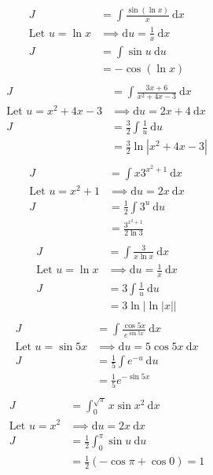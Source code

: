 \documentclass{article}
\theoremstyle{plain}
\theoremstyle{definition}
\begin{document}
\begin{align*}
	J&=\int \frac{\sin(\ln x)}{x}\ \text{d}x \\
	\text{Let } u = \ln x &\implies \text{d}u = \frac{1}{x}\ \text{d}x \\
	J&=\int \sin u\ \text{d}u \\
	 &=-\cos(\ln x) \\
\end{align*}
\begin{align*}
	J&=\int \frac{3x+6}{x^2+4x-3}\ \text{d}x \\
	\text{Let } u = x^2+4x-3 &\implies \text{d}u = 2x+4\ \text{d}x \\
	J&=\frac{3}{2}\int \frac{1}{u}\ \text{d}u \\
	 &=\frac{3}{2}\ln \left|x^2+4x-3\right| \\
\end{align*}
\begin{align*}
	J&=\int x 3^{x^2+1}\ \text{d}x \\
	\text{Let } u = x^2+1 &\implies \text{d}u = 2x\ \text{d}x \\
	J&=\frac{1}{2}\int 3^u\ \text{d}u \\
	 &=\frac{3^{x^2+1}}{2\ln 3} \\
\end{align*}
\begin{align*}
	J&=\int \frac{3}{x\ln x}\ \text{d}x \\
	\text{Let } u = \ln x &\implies \text{d}u = \frac{1}{x}\ \text{d}x \\
	J&=3\int \frac{1}{u}\ \text{d}u \\
	 &=3 \ln \left|\ln |x|\right| \\
\end{align*}
\begin{align*}
	J&=\int \frac{\cos 5x}{e^{\sin 5x}}\ \text{d}x \\
	\text{Let } u = \sin 5x &\implies \text{d}u = 5\cos 5x\ \text{d}x \\
	J&=\frac{1}{5}\int e^{-u}\ \text{d}u \\
	 &=\frac{1}{5} e^{-\sin 5x} \\
\end{align*}
\begin{align*}
	J&=\int_{0}^{\sqrt{\pi}} x\sin x^2\ \text{d}x \\
	\text{Let } u = x^2 &\implies \text{d}u = 2x\ \text{d}x \\
	J &= \frac{1}{2}\int_0^{\pi} \sin u\ \text{d}u \\
	  &= \frac{1}{2} (-\cos \pi + \cos 0) = 1
\end{align*}
\end{document}
